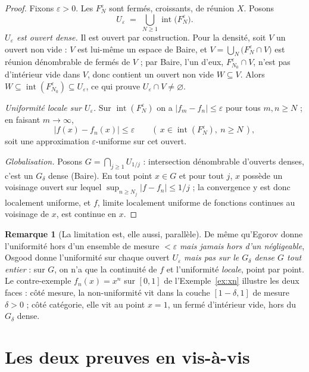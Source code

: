 \documentclass[11pt,a4paper]{article}
\theoremstyle{plain}
\theoremstyle{definition}
\newtheorem{remarque}{Remarque}
\newcommand{\1}{\mathbf{1}}
\newcommand{\abs}[1]{\left|#1\right|}
\DeclareMathOperator{\intt}{int}
\begin{document}
\begin{proof}
Fixons $\varepsilon>0$. Les $F_N^{\varepsilon}$ sont fermés, croissants, de
réunion $X$. Posons
\[
  U_{\varepsilon}\;=\;\bigcup_{N\ge1}\intt\bigl(F_N^{\varepsilon}\bigr).
\]
\emph{$U_\varepsilon$ est ouvert dense.} Il est ouvert par construction. Pour la
densité, soit $V$ un ouvert non vide : $V$ est lui-même un espace de Baire, et
$V=\bigcup_N\bigl(F_N^{\varepsilon}\cap V\bigr)$ est réunion dénombrable de fermés
de $V$ ; par Baire, l'un d'eux, $F_{N_0}^{\varepsilon}\cap V$, n'est pas d'intérieur
vide dans $V$, donc contient un ouvert non vide $W\subseteq V$. Alors
$W\subseteq\intt(F_{N_0}^{\varepsilon})\subseteq U_\varepsilon$, ce qui prouve
$U_\varepsilon\cap V\ne\varnothing$.

\emph{Uniformité locale sur $U_\varepsilon$.} Sur $\intt(F_N^{\varepsilon})$ on a
$\abs{f_m-f_n}\le\varepsilon$ pour tous $m,n\ge N$ ; en faisant $m\to\infty$,
\[
  \abs{f(x)-f_n(x)}\le\varepsilon\qquad(\,x\in\intt(F_N^{\varepsilon}),\ n\ge N\,),
\]
soit une approximation $\varepsilon$-uniforme sur cet ouvert.

\emph{Globalisation.} Posons $G=\bigcap_{j\ge1}U_{1/j}$ : intersection dénombrable
d'ouverts denses, c'est un $G_\delta$ dense (Baire). En tout point $x\in G$ et pour
tout $j$, $x$ possède un voisinage ouvert sur lequel $\sup_{n\ge N_j}\abs{f-f_n}\le
1/j$ ; la convergence y est donc localement uniforme, et $f$, limite localement
uniforme de fonctions continues au voisinage de $x$, est continue en $x$.
\end{proof}

\begin{remarque}[La limitation est, elle aussi, parallèle]
De même qu'Egorov donne l'uniformité hors d'un ensemble de mesure $<\varepsilon$
\emph{mais jamais hors d'un négligeable}, Osgood donne l'uniformité sur chaque
ouvert $U_\varepsilon$ \emph{mais pas sur le $G_\delta$ dense $G$ tout entier} :
sur $G$, on n'a que la continuité de $f$ et l'uniformité \emph{locale}, point par
point. Le contre-exemple $f_n(x)=x^n$ sur $[0,1]$ de l'Exemple~\ref{ex:xn} illustre
les deux faces : côté mesure, la non-uniformité vit dans la couche $[1-\delta,1]$
de mesure $\delta>0$ ; côté catégorie, elle vit au point $x=1$, un fermé
d'intérieur vide, hors du $G_\delta$ dense.
\end{remarque}

\section{Les deux preuves en vis-à-vis}
\end{document}
